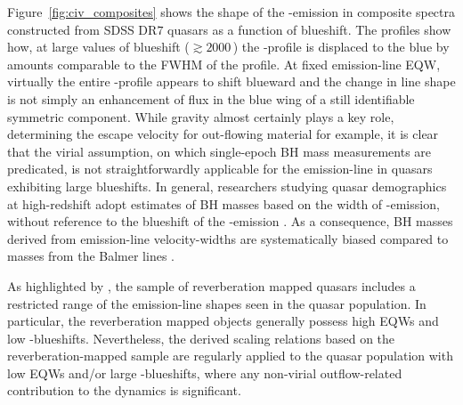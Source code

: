 Figure~\ref{fig:civ_composites} shows the shape of the -emission in composite spectra constructed from SDSS DR$7$ quasars as a function of  blueshift.
The profiles show how, at large values of blueshift ($\gtrsim2000$\,\kms) the -profile is displaced to the blue by amounts comparable to the FWHM of the profile.
At fixed emission-line EQW, virtually the entire -profile appears to shift blueward and the change in line shape is not simply an enhancement of flux in the blue wing of a still identifiable symmetric component.
While gravity almost certainly plays a key role, determining the escape velocity for out-flowing material for example, it is clear that the virial assumption, on which single-epoch BH mass measurements are predicated, is not straightforwardly applicable for the  emission-line in quasars exhibiting large blueshifts.
In general, researchers studying quasar demographics at high-redshift adopt estimates of BH masses based on the width of -emission, without reference to the blueshift of the -emission \citep[e.g.][]{vestergaard04,kollmeier06,gavignaud08,vestergaard08,vestergaard09,kelly10,kelly13}.
As a consequence, BH masses derived from  emission-line velocity-widths are systematically biased compared to masses from the Balmer lines \citep[e.g.][]{shen08,shen12}.

As highlighted by \citet{richards11}, the sample of reverberation mapped quasars includes a restricted range of the  emission-line shapes seen in the quasar population.
In particular, the reverberation mapped objects generally possess high  EQWs and low -blueshifts.
Nevertheless, the derived scaling relations based on the reverberation-mapped sample are regularly applied to the quasar population with low  EQWs and/or large -blueshifts, where any non-virial outflow-related contribution to the dynamics is significant.


